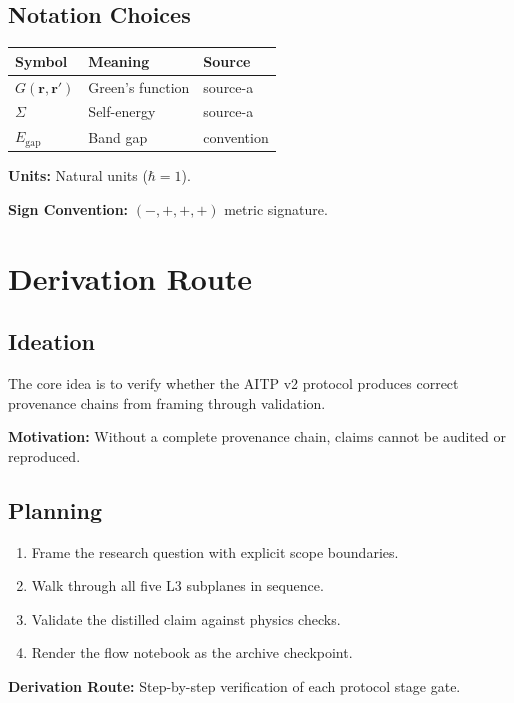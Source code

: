\documentclass[11pt,a4paper]{article}
\begin{document}
\subsection{Notation Choices}
\begin{tabular}{lll}
\toprule
\textbf{Symbol} & \textbf{Meaning} & \textbf{Source} \\
\midrule
$G(\mathbf{r}, \mathbf{r}')$ & Green's function & source-a \\
$\Sigma$ & Self-energy & source-a \\
$E_{\text{gap}}$ & Band gap & convention \\
\bottomrule
\end{tabular}

\medskip
\noindent\textbf{Units:} Natural units ($\hbar = 1$).

\noindent\textbf{Sign Convention:} $(-,+,+,+)$ metric signature.

\section{Derivation Route}

\subsection{Ideation}
The core idea is to verify whether the AITP v2 protocol produces
correct provenance chains from framing through validation.

\textbf{Motivation:} Without a complete provenance chain, claims
cannot be audited or reproduced.

\subsection{Planning}
\begin{enumerate}
  \item Frame the research question with explicit scope boundaries.
  \item Walk through all five L3 subplanes in sequence.
  \item Validate the distilled claim against physics checks.
  \item Render the flow notebook as the archive checkpoint.
\end{enumerate}

\textbf{Derivation Route:} Step-by-step verification of each protocol
stage gate.
\end{document}
